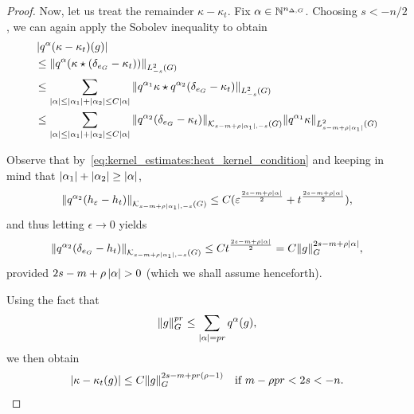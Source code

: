 \begin{proof}
    Now, let us treat the remainder $\kappa - \kappa_t$.
    Fix $\alpha \in \N^{\dimDifferenceOperators}$.
    Choosing $s < -n/2$,
    we can again apply the Sobolev inequality to obtain
    \begin{align*}
        &\abs {q^\alpha (\kappa - \kappa_t)(g)}\\
        &\leq \norm [\Sobolev {-s}] {q^\alpha(\conv \kappa {(\delta_{e_\Group} - \kappa_t)})}\\
        &\leq \sum_{\abs \alpha \leq \abs {\alpha_1} + \abs {\alpha_2} \leq C \abs \alpha}
        \norm [\Sobolev {-s}] {\conv {q^{\alpha_1} \kappa} {q^{\alpha_2} (\delta_{e_\Group} - \kappa_t)}}\\
        &\leq \sum_{\abs \alpha \leq \abs {\alpha_1} + \abs {\alpha_2} \leq C \abs \alpha}
        \norm [\KernelsSobolev {s - m + \rho \abs {\alpha_1}} {-s}] {q^{\alpha_2}(\delta_{e_\Group} - \kappa_t)}
        \norm [\Sobolev {s - m + \rho \abs {\alpha_1}}] {q^{\alpha_1} \kappa}
    \end{align*}

    Observe that by~\eqref{eq:kernel_estimates:heat_kernel_condition}
    and keeping in mind that $\abs {\alpha_1} + \abs {\alpha_2} \geq \abs \alpha$,
    \begin{align*}
        \norm [\KernelsSobolev {s - m + \rho \abs {\alpha_1}} {-s}] {q^{\alpha_2} (h_{\epsilon} - h_t)}
        \leq C (\epsilon^{\frac{2s - m + \rho \abs \alpha} 2} + t^{\frac{2s - m + \rho \abs \alpha} 2}),
    \end{align*}
    and thus letting $\epsilon \to 0$ yields
    \begin{align*}
        \norm [\KernelsSobolev {s - m + \rho \abs {\alpha_1}} {-s}] {q^{\alpha_2} (\delta_{e_\Group} - h_t)}
        \leq C t^{\frac {2s - m + \rho \abs \alpha} 2}
        = C \norm [\Group] g^{2s - m + \rho \abs \alpha},
    \end{align*}
    provided $2s - m + \rho \abs {\alpha} > 0$
    (which we shall assume henceforth).

    Using the fact that
    \begin{align*}
        \norm [\Group] g^{p r}
        \leq \sum_{\abs \alpha = p r} q^\alpha(g),
    \end{align*}
    we then obtain
    \begin{align}
        \abs {\kappa - \kappa_t(g)}
        \leq C \norm [\Group] g^{2s - m + p r(\rho - 1)}
        \quad
        \text{if }
        m - \rho p r < 2s < -n.
        \label{eq:kernel_estimate_with_choice_of_s}
    \end{align}


\end{proof}
